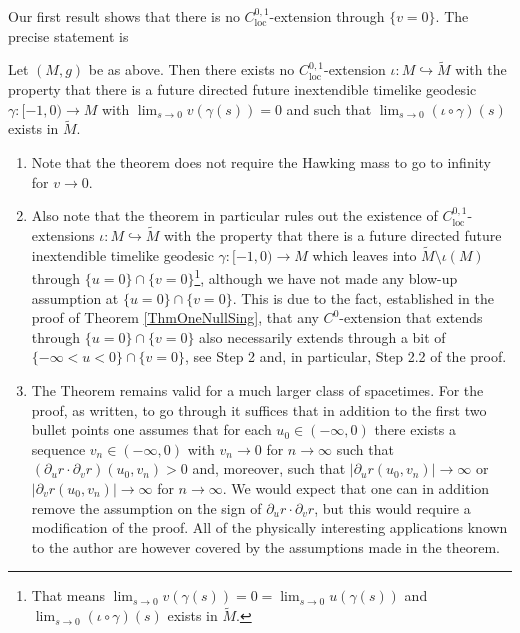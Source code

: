 \documentclass[reqno]{article}
\newcommand{\loc}{\mathrm{loc}}
\newcommand{\rd}{\partial}
\begin{document}
Our first result shows that there is no $C^{0,1}_{\loc}$-extension through $\{v=0\}$. The precise statement is
\begin{theorem}\label{ThmOneNullSing}
Let $(M,g)$ be as above. Then there exists no $C^{0,1}_{\loc}$-extension $\iota : M \hookrightarrow \tilde{M}$ with the property that there is a future directed future inextendible timelike geodesic $\gamma : [-1,0) \to M$ with $\lim_{s \to 0} v(\gamma(s)) = 0$ and such that $\lim_{s \to 0} (\iota \circ \gamma)(s)$ exists in $\tilde{M}$.
\end{theorem}
\begin{remark}
\begin{enumerate}
\item Note that the theorem does not require the Hawking mass to go to infinity for $v \to 0$.
\item Also note that the theorem in particular rules out the existence of $C^{0,1}_{\loc}$-extensions $\iota : M \hookrightarrow \tilde{M}$ with the property that there is a future directed future inextendible timelike geodesic $\gamma : [-1,0) \to M$ which leaves into $\tilde{M} \setminus \iota(M)$ through $\{u=0\} \cap \{v=0\}$\footnote{That means $\lim_{s \to 0} v(\gamma(s)) = 0 = \lim_{s \to 0} u(\gamma(s))$ and $\lim_{s \to 0} (\iota \circ \gamma)(s)$ exists in $\tilde{M}$.}, although we have not made any blow-up assumption at $\{u=0\} \cap \{v=0\}$. This is due to the fact, established in the proof of Theorem \ref{ThmOneNullSing}, that any $C^0$-extension that extends through $\{u=0\} \cap \{v=0\}$ also necessarily extends through a bit of $ \{ -\infty < u < 0\} \cap \{v=0\}$, see Step 2 and, in particular, Step 2.2 of the proof.
\item The Theorem remains valid for a much larger class of spacetimes. For the proof, as written, to go through it suffices that in addition to the first two bullet points one assumes that for each $u_0 \in (-\infty, 0)$ there exists a sequence $v_n \in (-\infty, 0)$ with $v_n \to 0$ for $n \to \infty$ such that $(\rd_u r \cdot \rd_v r) (u_0, v_n) >0$ and, moreover, such that $|\rd_u r (u_0, v_n)| \to \infty$ or $|\rd_v r(u_0, v_n)| \to \infty$ for $n \to \infty$. We would expect that one can in addition remove the assumption on the sign of $\rd_u r \cdot \rd_v r$, but this would require a modification of the proof. All of the physically interesting applications known to the author are however covered by the assumptions made in the theorem.
\end{enumerate}
\end{remark}
\end{document}
